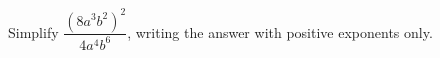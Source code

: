 Simplify $\dfrac{\left(8a^3b^2\right)^2}{4a^4b^6}$, writing the answer with positive exponents only.

